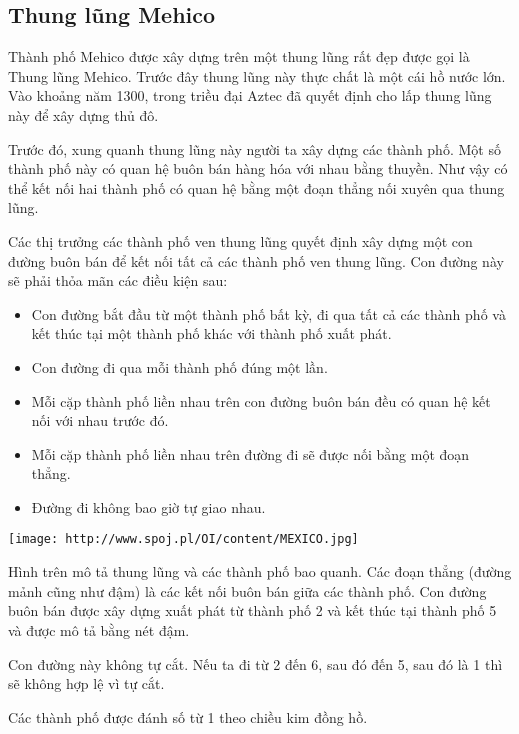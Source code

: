 







\subsection{   Thung lũng Mehico  }

   Thành phố Mehico được xây dựng trên một thung lũng rất đẹp được gọi là Thung lũng Mehico. Trước đây thung lũng này thực chất là một cái hồ nước lớn. Vào khoảng năm 1300, trong triều đại Aztec đã quyết định cho lấp thung lũng này để xây dựng thủ đô.  

   Trước đó, xung quanh thung lũng này người ta xây dựng các thành phố. Một số thành phố này có quan hệ buôn bán hàng hóa với nhau bằng thuyền. Như vậy có thể kết nối hai thành phố có quan hệ bằng một đoạn thẳng nối xuyên qua thung lũng.  

   Các thị trưởng các thành phố ven thung lũng quyết định xây dựng một con đường buôn bán để kết nối tất cả các thành phố ven thung lũng. Con đường này sẽ phải thỏa mãn các điều kiện sau:  
\begin{itemize}
	\item     Con đường bắt đầu từ một thành phố bất kỳ, đi qua tất cả các thành phố và kết thúc tại một thành phố khác với thành phố xuất phát.   
	\item     Con đường đi qua mỗi thành phố đúng một lần.   
	\item     Mỗi cặp thành phố liền nhau trên con đường buôn bán đều có quan hệ kết nối với nhau trước đó.   
	\item     Mỗi cặp thành phố liền nhau trên đường đi sẽ được nối bằng một đoạn thẳng.   
	\item     Đường đi không bao giờ tự giao nhau.   
\end{itemize}


\texttt{[image: http://www.spoj.pl/OI/content/MEXICO.jpg]}

   Hình trên mô tả thung lũng và các thành phố bao quanh. Các đoạn thẳng (đường mảnh cũng như đậm) là các kết nối buôn bán giữa các thành phố. Con đường buôn bán được xây dựng xuất phát từ thành phố 2 và kết thúc tại thành phố 5 và được mô tả bằng nét đậm.  

   Con đường này không tự cắt. Nếu ta đi từ 2 đến 6, sau đó đến 5, sau đó là 1 thì sẽ không hợp lệ vì tự cắt.  

   Các thành phố được đánh số từ 1 theo chiều kim đồng hồ.  

